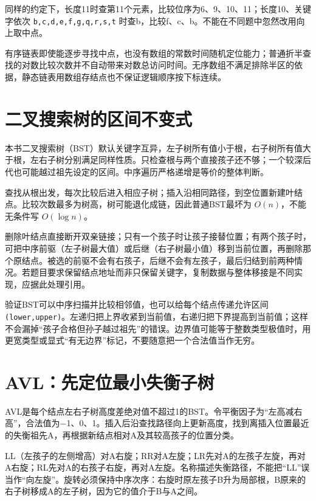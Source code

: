 同样的约定下，长度11时查第11个元素，比较位序为6、9、10、11；长度10、关键字依次 \texttt{b,}\allowbreak{}\texttt{c,}\allowbreak{}\texttt{d,}\allowbreak{}\texttt{e,}\allowbreak{}\texttt{f,}\allowbreak{}\texttt{g,}\allowbreak{}\texttt{q,}\allowbreak{}\texttt{r,}\allowbreak{}\texttt{s,}\allowbreak{}\texttt{t} 时查b，比较f、c、b。不能在不同题中忽然改用向上取中点。

有序链表即使能逐步寻找中点，也没有数组的常数时间随机定位能力；普通折半查找的对数比较次数并不自动带来对数总访问时间。无序数组不满足排除半区的依据，静态链表用数组存结点也不保证逻辑顺序按下标连续。

\section{二叉搜索树的区间不变式}\label{ds-07-04}

本书二叉搜索树（BST）默认关键字互异，左子树所有值小于根，右子树所有值大于根，左右子树分别满足同样性质。只检查根与两个直接孩子还不够；一个较深后代也可能越过祖先设定的区间。中序遍历严格递增是等价的整体判断。

查找从根出发，每次比较后进入相应子树；插入沿相同路径，到空位置新建叶结点。比较次数最多为树高，树可能退化成链，因此普通BST最坏为 \(O(n)\)，不能无条件写 \(O(\log n)\)。

删除叶结点直接断开双亲链接；只有一个孩子时让孩子接替位置；有两个孩子时，可把中序前驱（左子树最大值）或后继（右子树最小值）移到当前位置，再删除那个原结点。被选的前驱不会有右孩子，后继不会有左孩子，最后归结到前两种情况。若题目要求保留结点地址而非只保留关键字，复制数据与整体移接是不同实现，应据此处理引用。

验证BST可以中序扫描并比较相邻值，也可以给每个结点传递允许区间 \texttt{(lower,}\allowbreak{}\texttt{upper)}。左递归把上界收紧到当前值，右递归把下界提高到当前值；这样不会漏掉``孩子合格但孙子越过祖先''的错误。边界值可能等于整数类型极值时，用更宽类型或显式``有无边界''标记，不要随意把一个合法值当作无穷。

\section{AVL：先定位最小失衡子树}\label{ds-07-05}

AVL是每个结点左右子树高度差绝对值不超过1的BST。令平衡因子为``左高减右高''，合法值为−1、0、1。插入后沿查找路径向上更新高度，找到离插入位置最近的失衡祖先A，再根据新结点相对A及其较高孩子的位置分类。

LL（左孩子的左侧增高）对A右旋；RR对A左旋；LR先对A的左孩子左旋，再对A右旋；RL先对A的右孩子右旋，再对A左旋。名称描述失衡路径，不能把``LL''误当作``向左旋''。旋转必须保持中序次序：右旋时原左孩子B升为局部根，B原来的右子树移成A的左子树，因为它的值介于B与A之间。

